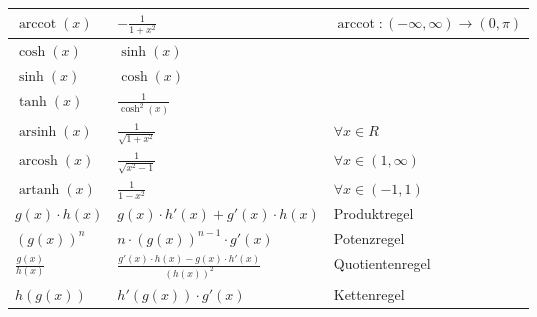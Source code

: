 \documentclass[25pt]{sciposter}
\begin{document}
\begin{multicols}{3}
{\begin{table}[]
\begin{tabular}{@{} p{} p{} p{} @{}}
					$\operatorname{arccot}(x)$ & $ - \frac{1}{1+x^2} $ & $\operatorname{arccot} : (-\infty, \infty) \to (0,\pi)$\\
					\midrule
					$\cosh(x)$ & $\sinh(x)$ &\\
					$\sinh(x)$ & $\cosh(x)$ & \\
					$\tanh(x)$ & $\frac{1}{\cosh^2(x)}$ & \\
					$\operatorname{arsinh}(x)$ & $\frac{1}{\sqrt{1+x^2}}$ & $\forall x \in R$\\
					$\operatorname{arcosh}(x)$ & $\frac{1}{\sqrt{x^2 - 1}}$ & $\forall x \in (1, \infty)$\\		  $\operatorname{artanh}(x)$ & $\frac{1}{1-x^2}$ & $\forall x \in (-1,1)$\\
					\midrule
					$g(x) \cdot h(x)$ & $g(x) \cdot h'(x) + g'(x) \cdot h(x)$ & Produktregel\\
					$\left(g(x)\right)^n$ & $n \cdot \left( g(x) \right)^{n-1} \cdot g'(x)$ & Potenzregel\\
					$\frac{g(x)}{h(x)}$ & $\frac{ g'(x) \cdot h(x) - g(x)\cdot h'(x)}{\left(h(x)\right) ^2}$ & Quotientenregel\\
					$h(g(x))$ & $h'(g(x)) \cdot g'(x)$ & Kettenregel\\
					\bottomrule
				\end{tabular}
			\end{table}
		}
		
		
		
		
		
	\end{multicols}
\end{document}
